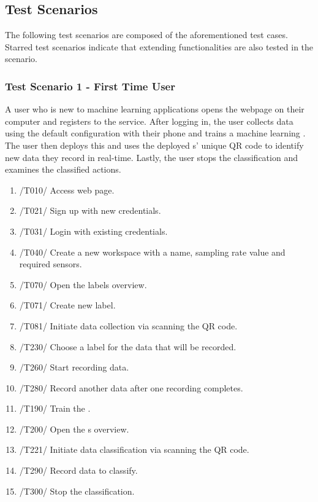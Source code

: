 \subsection{Test Scenarios}
The following test scenarios are composed of the aforementioned test cases. Starred test scenarios indicate that extending functionalities are also tested in the scenario.
\subsubsection{Test Scenario 1 - First Time User}
A user who is new to machine learning applications opens the webpage on their computer and registers to the service. After logging in, the user collects data using the default configuration with their phone and trains a machine learning . The user then deploys this  and uses the deployed s' unique \gls{QR code} to identify new data they record in real-time. Lastly, the user stops the \gls{classification} and examines the classified actions.
\begin{enumerate}
    \item /T010/ Access web page.
    \item /T021/ Sign up with new credentials.
    \item /T031/ Login with existing credentials.
    \item /T040/ Create a new \gls{workspace} with a name, sampling rate value and required \glspl{sensor}.
    \item /T070/ Open the labels overview.
    \item /T071/ Create new label.
    \item /T081/ Initiate data collection via scanning the \gls{QR code}.
    \item /T230/ Choose a \gls{label} for the data that will be recorded.
    \item /T260/ Start recording data.
    \item /T280/ Record another data after one recording completes.
    \item /T190/ Train the .
    \item /T200/ Open the s overview.
    \item /T221/ Initiate data \gls{classification} via scanning the \gls{QR code}.
    \item /T290/ Record data to classify.
    \item /T300/ Stop the \gls{classification}.
\end{enumerate}
